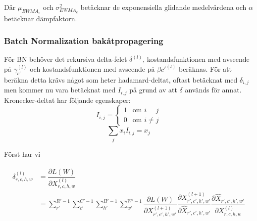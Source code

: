 \documentclass[a4paper,11pt,twoside]{article}
\newcommand*{\pd}[2]{\ensuremath{\dfrac{\partial #1}{\partial #2}}}
\begin{document}
Där $\mu_{EWMA_c}$ och $\sigma^2_{EWMA_c}$ betäcknar de exponensiella glidande medelvärdena och $\alpha$ betäcknar dämpfaktorn.


\subsubsection{Batch Normalization bakåtpropagering}
För BN behöver det rekursiva delta-felet $\delta^{(l)}$, kostandsfunktionen med avseende på $\gamma_{c'}^{(l)}$ och kostandsfunktionen med avseende på $\beta{c'}^{(l)}$ beräknas. För att beräkna detta krävs något som heter hadamard-deltat, oftast betäcknat med $\delta_{i,j}$ men kommer nu vara betäcknat med $I_{i,j}$ på grund av att $\delta$ används för annat. Kronecker-deltat har följande egenskaper:
\begin{equation}
I_{i,j} = \begin{cases} 1 & \mbox{om } i = j \\ 0 & \mbox{om } i \neq j  \end{cases}
\end{equation}
\begin{equation}
\sum_j  x_i  I_{i,j} = x_j
\end{equation}

Först har vi

\begin{align}\label{BN_delta_error}
\begin{split}
	\delta^{(l)}_{r,c,h,w}
		& = \pd{L(W)}{X^{(l)}_{r,c,h,w}} \\
		& = \sum^{R'-1}_{r'} \sum^{C'-1}_{c'} \sum^{H'-1}_{h'} \sum^{W'-1}_{w'} \pd{L(W)}{X^{(l+1)}_{r',c',h',w'}} \pd{X^{(l+1)}_{r',c',h',w'}}{\hat{X}_{r',c',h',w'}} \pd{\hat{X}_{r',c',h',w'}}{{X}^{(l)}_{r,c,h,w}}\\
\end{split}
\end{align}
\end{document}
